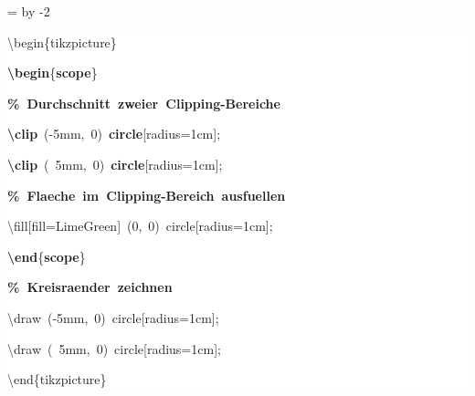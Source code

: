 \begingroup
\ttfamily
{}
=\textwidth
\advance{} by -2\fboxsep
\noindent
\colorbox{background}
{%
\parbox{\dimen255}
{%
\rule[-0.5ex]{0pt}{2.5ex}\hspace*{0.0em}\textbackslash{}begin\{tikzpicture\}\\
\rule[-0.5ex]{0pt}{2.5ex}\hspace*{1.0em}\textcolor{R}{\textbf{\textbackslash{}begin}}\{\textcolor{R}{\textbf{scope}}\}\\
\rule[-0.5ex]{0pt}{2.5ex}\hspace*{2.0em}\textcolor{G}{\textbf{\%~Durchschnitt~zweier~Clipping{-}Bereiche}}\\
\rule[-0.5ex]{0pt}{2.5ex}\hspace*{2.0em}\textcolor{R}{\textbf{\textbackslash{}clip}}~({-}5mm,~0)~\textcolor{R}{\textbf{circle}}[radius=1cm];\\
\rule[-0.5ex]{0pt}{2.5ex}\hspace*{2.0em}\textcolor{R}{\textbf{\textbackslash{}clip}}~(~5mm,~0)~\textcolor{R}{\textbf{circle}}[radius=1cm];\\
\rule[-0.5ex]{0pt}{2.5ex}\hspace*{2.0em}\textcolor{G}{\textbf{\%~Flaeche~im~Clipping{-}Bereich~ausfuellen}}\\
\rule[-0.5ex]{0pt}{2.5ex}\hspace*{2.0em}\textbackslash{}fill[fill=LimeGreen]~(0,~0)~circle[radius=1cm];\\
\rule[-0.5ex]{0pt}{2.5ex}\hspace*{1.0em}\textcolor{R}{\textbf{\textbackslash{}end}}\{\textcolor{R}{\textbf{scope}}\}\\
\rule[-0.5ex]{0pt}{2.5ex}\hspace*{1.0em}\textcolor{G}{\textbf{\%~Kreisraender~zeichnen}}\\
\rule[-0.5ex]{0pt}{2.5ex}\hspace*{1.0em}\textbackslash{}draw~({-}5mm,~0)~circle[radius=1cm];\\
\rule[-0.5ex]{0pt}{2.5ex}\hspace*{1.0em}\textbackslash{}draw~(~5mm,~0)~circle[radius=1cm];\\
\rule[-0.5ex]{0pt}{2.5ex}\hspace*{0.0em}\textbackslash{}end\{tikzpicture\}}%
}%
\endgroup
